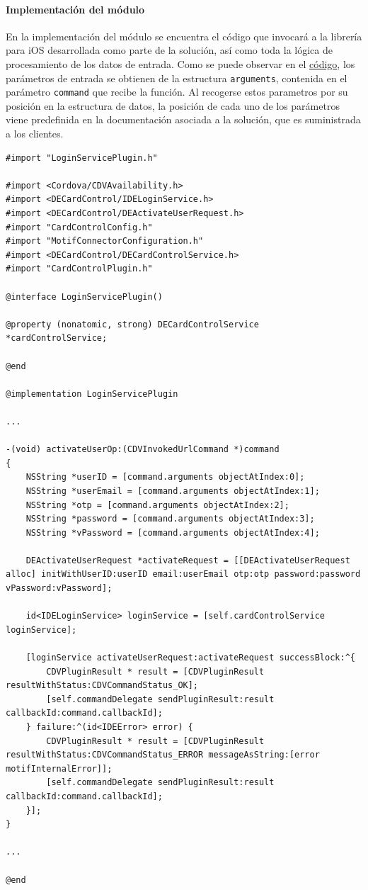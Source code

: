 \documentclass[a4paper, 12pt]{article}
\newenvironment{code}{\captionsetup{type=listing}}{}
\begin{document}
\paragraph{Implementación del módulo}
\label{sec-4-3-3-2}
En la implementación del módulo se encuentra el código que invocará a la librería para iOS desarrollada como parte de la solución, así como toda la lógica de procesamiento de los datos de entrada. Como
se puede observar en el \hyperref[code:cordova-ios-implementation]{código}, los parámetros de entrada se obtienen de la estructura \verb~arguments~, contenida en el parámetro \verb~command~ que recibe la función.
Al recogerse estos parametros por su posición en la estructura de datos, la posición de cada uno de los parámetros viene predefinida en la documentación asociada a la solución, que es suministrada a los
clientes.
\begin{code}
\label{code:cordova-ios-implementation}
\begin{verbatim}
#import "LoginServicePlugin.h"

#import <Cordova/CDVAvailability.h>
#import <DECardControl/IDELoginService.h>
#import <DECardControl/DEActivateUserRequest.h>
#import "CardControlConfig.h"
#import "MotifConnectorConfiguration.h"
#import <DECardControl/DECardControlService.h>
#import "CardControlPlugin.h"

@interface LoginServicePlugin()

@property (nonatomic, strong) DECardControlService *cardControlService;

@end

@implementation LoginServicePlugin

...

-(void) activateUserOp:(CDVInvokedUrlCommand *)command
{
    NSString *userID = [command.arguments objectAtIndex:0];
    NSString *userEmail = [command.arguments objectAtIndex:1];
    NSString *otp = [command.arguments objectAtIndex:2];
    NSString *password = [command.arguments objectAtIndex:3];
    NSString *vPassword = [command.arguments objectAtIndex:4];

    DEActivateUserRequest *activateRequest = [[DEActivateUserRequest alloc] initWithUserID:userID email:userEmail otp:otp password:password vPassword:vPassword];

    id<IDELoginService> loginService = [self.cardControlService loginService];

    [loginService activateUserRequest:activateRequest successBlock:^{
        CDVPluginResult * result = [CDVPluginResult resultWithStatus:CDVCommandStatus_OK];
        [self.commandDelegate sendPluginResult:result callbackId:command.callbackId];
    } failure:^(id<IDEError> error) {
        CDVPluginResult * result = [CDVPluginResult resultWithStatus:CDVCommandStatus_ERROR messageAsString:[error motifInternalError]];
        [self.commandDelegate sendPluginResult:result callbackId:command.callbackId];
    }];
}

...

@end

\end{verbatim}
\end{code}
\bigbreak
\end{document}
